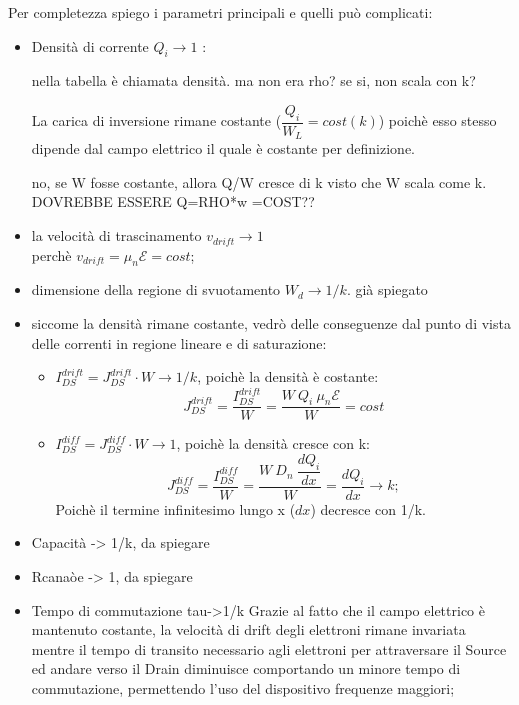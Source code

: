 %
Per completezza spiego i parametri principali e quelli può complicati:
\begin{itemize}
    \item Densità di corrente $Q_i \rightarrow 1$ :
    \begin{ricevimento}
        nella tabella è chiamata densità. ma non era rho? se si, non scala con k?
    \end{ricevimento}
        La carica di inversione rimane costante ($\dfrac{Q_i}{W_L}=cost(k)$) poichè esso stesso dipende dal campo elettrico il quale è costante per definizione.
        \begin{ricevimento}
            no, se W fosse costante, allora Q/W cresce di k visto che W scala come k. DOVREBBE ESSERE Q=RHO*w =COST??
        \end{ricevimento}
    \item la velocità di trascinamento $v_{drift} \rightarrow 1$ \\
        perchè $v_{drift}=\mu_n \mathcal{E}=cost$;

    \item dimensione della regione di svuotamento $W_d \rightarrow 1/k$. già spiegato
    
    \item siccome la densità rimane costante, vedrò delle conseguenze dal punto di vista delle correnti in regione lineare e di saturazione:
        \begin{itemize}[label=$\ast$]
            \item $I_{DS}^{drift}= J_{DS}^{drift} \cdot W \rightarrow 1/k$, poichè la densità è costante:
                \begin{equation}
                    J_{DS}^{drift}=\dfrac{I_{DS}^{drift}}{W}=\dfrac{W\ Q_i\ \mu_n \mathcal{E}}{W} = cost
                \end{equation}
            \item $I_{DS}^{diff}= J_{DS}^{diff} \cdot W \rightarrow 1$, poichè la densità cresce con k:
                \begin{equation}
                    J_{DS}^{diff}=\dfrac{I_{DS}^{diff}}{W}=\dfrac{W\ D_n\ \dfrac{dQ_i}{dx}}{W}=\dfrac{dQ_i}{dx} \rightarrow k;
                \end{equation}
                Poichè il termine infinitesimo lungo x ($dx$) decresce con 1/k.
        \end{itemize}

    \item Capacità -> 1/k, da spiegare

    \item Rcanaòe -> 1, da spiegare

    \item Tempo di commutazione tau->1/k
    Grazie al fatto che il campo elettrico è mantenuto costante, la velocità di drift degli elettroni rimane invariata mentre il tempo di transito necessario agli elettroni per attraversare il Source ed andare verso il Drain diminuisce comportando un minore tempo di commutazione, permettendo l'uso del dispositivo frequenze maggiori;
    
        
\end{itemize}
